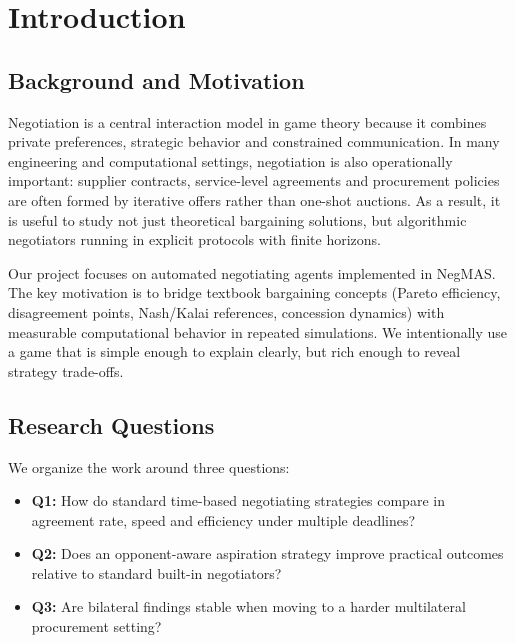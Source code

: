\documentclass[11pt]{article}
\begin{document}
\tableofcontents
\clearpage
{}

\section{Introduction}
\subsection{Background and Motivation}
Negotiation is a central interaction model in game theory because it combines private preferences, strategic behavior and constrained communication. In many engineering and computational settings, negotiation is also operationally important: supplier contracts, service-level agreements and procurement policies are often formed by iterative offers rather than one-shot auctions. As a result, it is useful to study not just theoretical bargaining solutions, but algorithmic negotiators running in explicit protocols with finite horizons.

Our project focuses on automated negotiating agents implemented in NegMAS. The key motivation is to bridge textbook bargaining concepts (Pareto efficiency, disagreement points, Nash/Kalai references, concession dynamics) with measurable computational behavior in repeated simulations. We intentionally use a game that is simple enough to explain clearly, but rich enough to reveal strategy trade-offs.

\subsection{Research Questions}
We organize the work around three questions:
\begin{itemize}[leftmargin=1.5em]
    \item \textbf{Q1:} How do standard time-based negotiating strategies compare in agreement rate, speed and efficiency under multiple deadlines?
    \item \textbf{Q2:} Does an opponent-aware aspiration strategy improve practical outcomes relative to standard built-in negotiators?
    \item \textbf{Q3:} Are bilateral findings stable when moving to a harder multilateral procurement setting?
\end{itemize}
\end{document}

